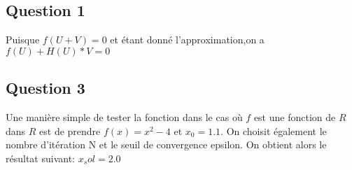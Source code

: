 \subsection {Question 1} 
Puisque $f(U+V)=0$ et étant donné l'approximation,on a
\newline
 $f(U)+H(U)*V=0$

\subsection{Question 3}

Une manière simple de tester la fonction dans le cas où $f$ est une fonction de $R$ dans $R$ est de prendre $f(x)=x^2-4$ et $x_0=1.1$. On choisit également le nombre d'itération N et le seuil de convergence epsilon. On obtient alors le résultat suivant:
\newline
$x_sol=2.0$